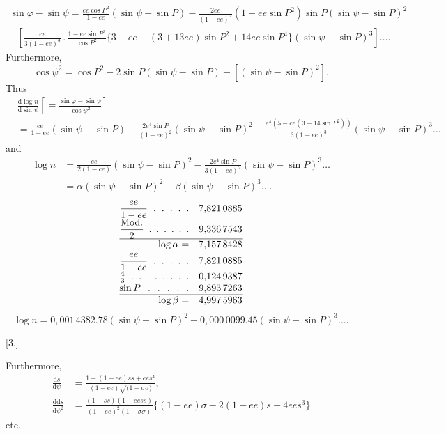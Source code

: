 \noindent [or]
\[
\begin{gathered}
\sin\varphi-\sin\psi=\frac{ee\cos P^2}{1-ee}(\sin\psi-\sin P)
-\frac{2ee}{(1-ee)^2}(1-ee\sin P^2)\sin P(\sin\psi-\sin P)^2\\
-\left[\frac{ee}{3(1-ee)^3}\,.\,\frac{1-ee\sin P^2}{\cos P^2}
\{3-ee-(3+13ee)\sin P^2+14ee\sin P^4\}(\sin\psi-\sin P)^3\right]\ldots.
\end{gathered}
\]
\noindent Furthermore,
\[
\cos\psi^2=\cos P^2-2\sin P(\sin\psi-\sin P)-[(\sin\psi-\sin P)^2].
\]
\noindent Thus
\[
\begin{aligned}
&\frac{\mathrm d\log n}{\mathrm d\sin\psi}
\left[=\frac{\sin\varphi-\sin\psi}{\cos\psi^2}\right]\\
&=\frac{ee}{1-ee}(\sin\psi-\sin P)-\frac{2e^4\sin P}{(1-ee)^2}(\sin\psi-\sin P)^2
-\frac{e^4(5-ee(3+14\sin P^2))}{3(1-ee)^3}(\sin\psi-\sin P)^3\ldots
\end{aligned}
\]
\noindent and
\[
\begin{aligned}
\log n
&=\frac{ee}{2(1-ee)}(\sin\psi-\sin P)^2
-\frac{2e^4\sin P}{3(1-ee)^2}(\sin\psi-\sin P)^3\ldots\\
&=\alpha(\sin\psi-\sin P)^2-\beta(\sin\psi-\sin P)^3\ldots.
\end{aligned}
\]
\noindent [For the flattening \(\frac1{303{,}45..}\) and \(P=51^\circ31'48''{,}70\), we have]
\[
\begin{array}{@{}r@{\quad}l@{}}
\makebox[25mm][s]{\(\displaystyle\frac{ee}{1-ee}\)\hfill .\hfill .\hfill .\hfill .\hfill .}
&7{,}821\,0885\\[.7ex]
\makebox[25mm][s]{\(\displaystyle\frac{\mathrm{Mod.}}2\)\hfill .\hfill .\hfill .\hfill .\hfill .\hfill .}
&9{,}336\,7543\\[.7ex]\hline
\log\alpha=&7{,}157\,8428\\[.5ex]
\makebox[25mm][s]{\(\displaystyle\frac{ee}{1-ee}\)\hfill .\hfill .\hfill .\hfill .\hfill .}
&7{,}821\,0885\\[.7ex]
\makebox[25mm][s]{\(\tfrac43\)\hfill .\hfill .\hfill .\hfill .\hfill .\hfill .\hfill .\hfill .}
&0{,}124\,9387\\
\makebox[25mm][s]{\(\sin P\)\hfill .\hfill .\hfill .\hfill .\hfill .}
&9{,}893\,7263\\\hline
\log\beta=&4{,}997\,5963
\end{array}
\]
\[
\log n=0{,}001\,4382.78(\sin\psi-\sin P)^2-0{,}000\,0099.45(\sin\psi-\sin P)^3\ldots.
\]

\begin{center}[3.]\end{center}
Furthermore,
\[
\begin{aligned}
\frac{\mathrm ds}{\mathrm d\psi}
&=\frac{1-(1+ee)ss+ees^4}{(1-ee)\surd(1-\sigma\sigma)},\\
\frac{\mathrm{dd}s}{\mathrm d\psi^2}
&=\frac{(1-ss)(1-eess)}{(1-ee)^2(1-\sigma\sigma)}
\{(1-ee)\sigma-2(1+ee)s+4ees^3\}
\end{aligned}
\]
\noindent\hfill etc.\hfill\null\par

